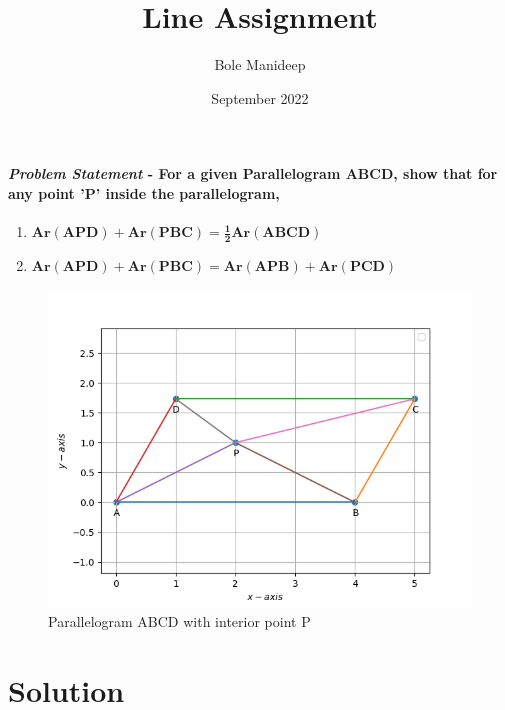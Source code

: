 \documentclass[journal,10pt,twocolumn]{article}
\title{\textbf{Line Assignment}}
\author{Bole Manideep}
\date{September 2022}
\begin{document}
\maketitle
\paragraph{\textit{Problem Statement} - For a given Parallelogram ABCD, show that for any
point ’P’ inside the parallelogram,}
\begin{enumerate}
	\item $\boldsymbol{Ar(APD)+Ar(PBC) = \frac{1}{2}Ar(ABCD)}$
	\item $\boldsymbol{Ar(APD)+Ar(PBC) = Ar(APB)+Ar(PCD)}$
\end{enumerate}

\begin{figure}[h]
\centering
\includegraphics[width=1\columnwidth]{Question.png}
\caption{Parallelogram ABCD with interior point P}
\label{fig:Parallelogram}
\end{figure}

\section*{Solution}
\end{document}
